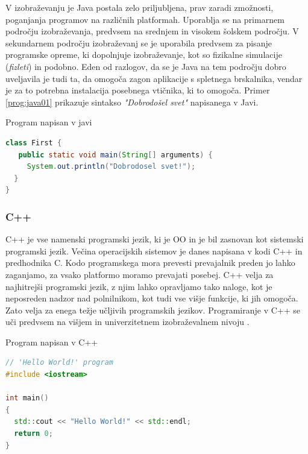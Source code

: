 V izobraževanju je Java postala zelo priljubljena, prav zaradi
zmožnosti, poganjanja programov na različnih platformah. Uporablja se
na primarnem področju izobraževanja, predvsem na srednjem in visokem
šolskem področju. V sekundarnem področju izobraževanj se je uporabila
predvsem za pisanje programske opreme, ki dopolnjuje izobraževanje,
kot so fizikalne simulacije (\emph{fizleti}) in podobno. Eden od
razlogov, da se je Java na tem področju dobro uveljavila je tudi ta,
da omogoča zagon aplikacije s spletnega brskalnika, vendar je za to
potrebna instalacija posebnega vtičnika, ki to omogoča. Primer
\ref{prog:java01} prikazuje sintakso \emph{"Dobrodošel svet"}
napisanega v Javi.
\begin{examplebox}[label={prog:java01}]{Program napisan v javi}
\begin{lstlisting}[language=Java]
class First {
   public static void main(String[] arguments) {
     System.out.println("Dobrodosel svet!");
  }
}
\end{lstlisting}
\end{examplebox}


\subsubsection{C++}
\label{sec:pj_c++}

C++ je vse namenski programski jezik, ki je OO in je bil zasnovan kot
sistemski programski jezik. Večina operacijskih sistemov je danes
napisana v kodi C++ in predhodnika C. Kodo programskega mora prevesti
prevajalnik preden jo lahko zaganjamo, za vsako platformo moramo
prevajati posebej.  C++ velja za najhitrejši programski jezik, z njim
lahko opravljamo tako naloge, kot je neposreden nadzor nad
polnilnikom, kot tudi vse višje funkcije, ki jih omogoča. Zato velja
za enega težje učljivih programskih jezikov. Programiranje v C++ se
uči predvsem na višjem in univerzitetnem izobraževalnem nivoju \cite{wiki:cpp}.

\begin{examplebox}[label={prog:cpp01}]{Program napisan v C++}
\begin{lstlisting}[language=C++]
// 'Hello World!' program
#include <iostream>

int main()
{
  std::cout << "Hello World!" << std::endl;
  return 0;
}
\end{lstlisting}
\end{examplebox}

